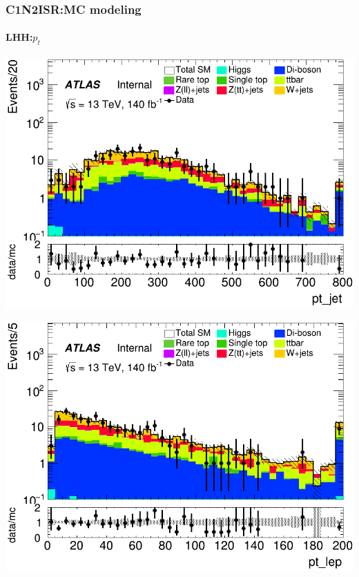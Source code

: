 \documentclass[usenames,dvipsnames]{beamer}
\begin{document}
\begin{frame}
\frametitle{C1N2ISR:MC modeling}
\framesubtitle{LHH:\quad $p_t$}
    \begin{minipage}{0.32\textwidth}
        \centering
        \includegraphics[width=\textwidth]{graphics/LHH_met/LHH_met_pt_jet.png}
    \end{minipage}
    \hfill
    \begin{minipage}{0.32\textwidth}
        \centering
        \includegraphics[width=\textwidth]{graphics/LHH_met/LHH_met_pt_lep.png}
    \end{minipage}
    \hfill
    \begin{minipage}{0.32\textwidth}
        \centering

\end{minipage}
\end{frame}
\end{document}
